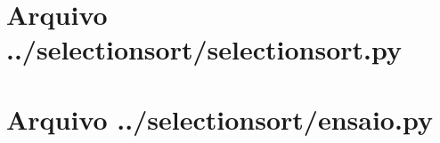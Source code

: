 \documentclass[12pt,a4paper,twoside]{report}
\begin{document}
\clearpage
\clearpage
{}
\appendix

\chapter{Arquivo ../selectionsort/selectionsort.py \label{ap:selectionsort}}


\chapter{Arquivo ../selectionsort/ensaio.py \label{ap:selectionsortensaio}}

\end{document}
